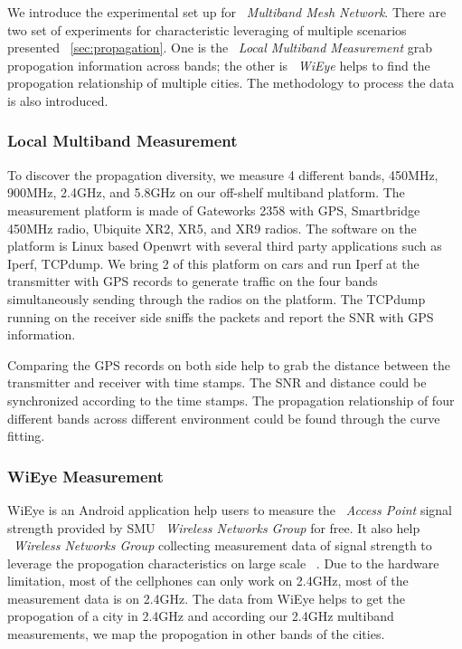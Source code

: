 We introduce the experimental set up for ~\emph{Multiband Mesh Network}. There are two set of experiments for characteristic leveraging of multiple scenarios presented ~\ref{sec:propagation}. 
One is the ~\emph{Local Multiband Measurement} grab propogation information across bands; the other is ~\emph{WiEye} helps to find the propogation relationship of multiple cities. The methodology to process the data is also introduced.

\subsubsection{Local Multiband Measurement}
To discover the propagation diversity, we measure 4 different bands, 450MHz, 900MHz, 2.4GHz, and 5.8GHz on our off-shelf multiband platform. 
The measurement platform is made of Gateworks 2358 with GPS, Smartbridge 450MHz radio, Ubiquite XR2, XR5, and XR9 radios. 
The software on the platform is Linux based Openwrt with several third party applications such as Iperf, TCPdump.
We bring 2 of this platform on cars and run Iperf at the transmitter with GPS records to generate traffic on the four bands simultaneously sending through the radios on the platform.
The TCPdump running on the receiver side sniffs the packets and report the SNR with GPS information.


Comparing the GPS records on both side help to grab the distance between the transmitter and receiver with time stamps. The SNR and distance could be synchronized according to the time stamps.
The propagation relationship of four different bands across different environment could be found through the curve fitting. 

\subsubsection{WiEye Measurement}
WiEye is an Android application help users to measure the ~\emph{Access Point} signal strength provided by SMU ~\emph{Wireless Networks Group} for free. It also help ~\emph{Wireless Networks Group} collecting measurement data of signal strength to leverage the propogation characteristics on large scale ~\cite{meikle2012global}.
Due to the hardware limitation, most of the cellphones can only work on 2.4GHz, most of the measurement data is on 2.4GHz. 
The data from WiEye helps to get the propogation of a city in 2.4GHz and according our 2.4GHz multiband measurements, we map the propogation in other bands of the cities. 

